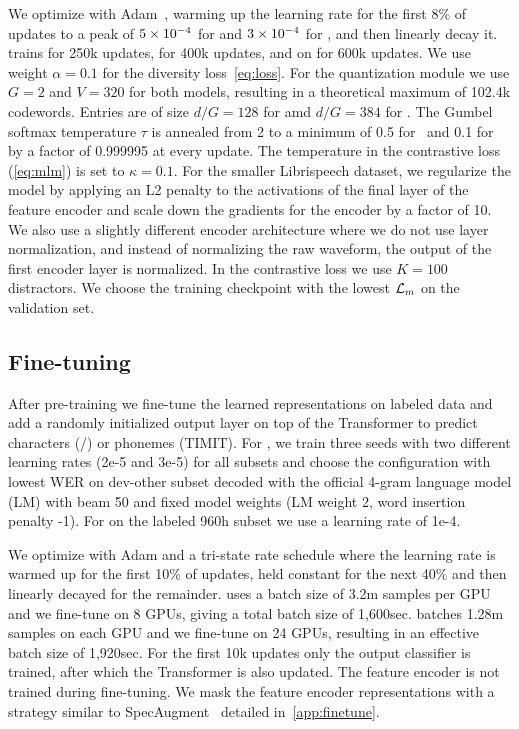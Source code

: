 \documentclass{article}
\begin{document}
We optimize with Adam~\citep{kingma2015adam}, warming up the learning rate for the first 8\% of updates to a peak of $\Enot{5e-4}$ for \wvppbase{} and $\Enot{3e-4}$ for \wvppbig{}, and then linearly decay it. 
\wvppbig{} trains for 250k updates, \wvppbase{} for 400k updates, and \wvppbig{} on \voxsz{} for 600k updates.
We use weight $\alpha=0.1$ for the diversity loss~\autoref{eq:loss}.
For the quantization module we use $G=2$ and $V=320$ for both models, resulting in a theoretical maximum of 102.4k codewords. 
Entries are of size $d/G = 128$ for \wvppbase{} amd $d/G = 384$ for \wvppbig{}.
The Gumbel softmax temperature $\tau$ is annealed from 2 to a minimum of 0.5 for~\wvppbase{} and 0.1 for~\wvppbig{} by a factor of 0.999995 at every update. 
The temperature in the contrastive loss (\autoref{eq:mlm}) is set to $\kappa=0.1$.
For the smaller Librispeech dataset, we regularize the model by applying an L2 penalty to the activations of the final layer of the feature encoder and scale down the gradients for the encoder by a factor of 10. 
We also use a slightly different encoder architecture where we do not use layer normalization, and instead of normalizing the raw waveform, the output of the first encoder layer is normalized.
In the contrastive loss we use $K=100$ distractors.
We choose the training checkpoint with the lowest $\mathcal{L}_{m}{}$ on the validation set.


\subsection{Fine-tuning}
\label{sec:setup-finetune}

After pre-training we fine-tune the learned representations on labeled data and add a randomly initialized output layer on top of the Transformer to predict characters (\libri{}/\libril{}) or phonemes (TIMIT).
For \libril{}, we train three seeds with two different learning rates (2e-5 and 3e-5) for all subsets and choose the configuration with lowest WER on dev-other subset decoded with the official 4-gram language model (LM) with beam 50 and fixed model weights (LM weight 2, word insertion penalty -1). 
For \wvppbase{} on the labeled 960h subset we use a learning rate of 1e-4.

We optimize with Adam and a tri-state rate schedule where the learning rate is warmed up for the first 10\% of updates, held constant for the next 40\% and then linearly decayed for the remainder. 
\wvppbase{} uses a batch size of 3.2m samples per GPU and we fine-tune on 8 GPUs, giving a total batch size of 1,600sec. 
\wvppbig{} batches 1.28m samples on each GPU and we fine-tune on 24 GPUs, resulting in an effective batch size of 1,920sec.
For the first 10k updates only the output classifier is trained, after which the Transformer is also updated. 
The feature encoder is not trained during fine-tuning. 
We mask the feature encoder representations with a strategy similar to SpecAugment~\citep{park2019specaugment} detailed in~\autoref{app:finetune}.
\end{document}
